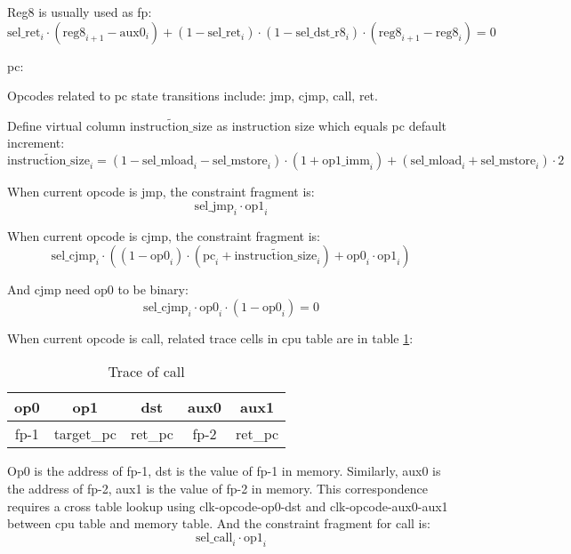 Reg8 is usually used as fp:
\[ \mathrm{sel\_ret}_i \cdot (\mathrm{reg8}_{i+1} - \mathrm{aux0}_i) + (1-\mathrm{sel\_ret}_i) \cdot (1 - \mathrm{sel\_dst\_r8}_i) \cdot (\mathrm{reg8}_{i+1} - \mathrm{reg8}_i)=0 \]

pc:

Opcodes related to pc state transitions include: jmp, cjmp, call, ret.

Define virtual column $\widetilde{\mathrm{instruction\_size}}$ as instruction size which equals pc default increment:
\[ \widetilde{\mathrm{instruction\_size}}_i = (1 - \mathrm{sel\_mload}_i - \mathrm{sel\_mstore}_i) \cdot (1 + \mathrm{op1\_imm}_i) + (\mathrm{sel\_mload}_i + \mathrm{sel\_mstore}_i) \cdot 2 \]

When current opcode is jmp, the constraint fragment is:
\[ \mathrm{sel\_jmp}_i \cdot \mathrm{op1}_i \]

When current opcode is cjmp, the constraint fragment is:
\[ \mathrm{sel\_cjmp}_i \cdot ((1 - \mathrm{op0}_i) \cdot (\mathrm{pc}_i + \widetilde{\mathrm{instruction\_size}}_i) + \mathrm{op0}_i \cdot \mathrm{op1}_i) \]

And cjmp need op0 to be binary:
\[ \mathrm{sel\_cjmp}_i \cdot \mathrm{op0}_i \cdot (1-\mathrm{op0}_i) = 0 \]

When current opcode is call, related trace cells in cpu table are in table \ref{table:constraint-call}:

\begin{table}[!ht]
    \centering
    \begin{tabular}{|c|c|c|c|c|}
        \hline
        \rowcolor{gray} op0       & op1        & dst                          & aux0                     & aux1                        \\
        \hline
        \cellcolor{green!20} fp-1 & target\_pc & \cellcolor{green!20} ret\_pc & \cellcolor{blue!20} fp-2 & \cellcolor{blue!20} ret\_pc \\
        \hline
    \end{tabular}
    \caption{Trace of call}
    \label{table:constraint-call}
\end{table}

Op0 is the address of fp-1, dst is the value of fp-1 in memory. Similarly, aux0 is the address of fp-2, aux1 is the value of fp-2 in memory. This correspondence requires a
cross table lookup using clk-opcode-op0-dst and clk-opcode-aux0-aux1 between cpu table and memory table. And the constraint fragment for call is:
\[ \mathrm{sel\_call}_i \cdot \mathrm{op1}_i \]

